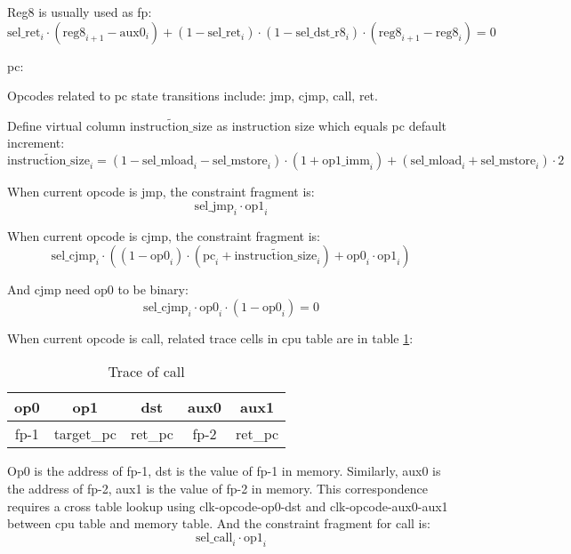 Reg8 is usually used as fp:
\[ \mathrm{sel\_ret}_i \cdot (\mathrm{reg8}_{i+1} - \mathrm{aux0}_i) + (1-\mathrm{sel\_ret}_i) \cdot (1 - \mathrm{sel\_dst\_r8}_i) \cdot (\mathrm{reg8}_{i+1} - \mathrm{reg8}_i)=0 \]

pc:

Opcodes related to pc state transitions include: jmp, cjmp, call, ret.

Define virtual column $\widetilde{\mathrm{instruction\_size}}$ as instruction size which equals pc default increment:
\[ \widetilde{\mathrm{instruction\_size}}_i = (1 - \mathrm{sel\_mload}_i - \mathrm{sel\_mstore}_i) \cdot (1 + \mathrm{op1\_imm}_i) + (\mathrm{sel\_mload}_i + \mathrm{sel\_mstore}_i) \cdot 2 \]

When current opcode is jmp, the constraint fragment is:
\[ \mathrm{sel\_jmp}_i \cdot \mathrm{op1}_i \]

When current opcode is cjmp, the constraint fragment is:
\[ \mathrm{sel\_cjmp}_i \cdot ((1 - \mathrm{op0}_i) \cdot (\mathrm{pc}_i + \widetilde{\mathrm{instruction\_size}}_i) + \mathrm{op0}_i \cdot \mathrm{op1}_i) \]

And cjmp need op0 to be binary:
\[ \mathrm{sel\_cjmp}_i \cdot \mathrm{op0}_i \cdot (1-\mathrm{op0}_i) = 0 \]

When current opcode is call, related trace cells in cpu table are in table \ref{table:constraint-call}:

\begin{table}[!ht]
    \centering
    \begin{tabular}{|c|c|c|c|c|}
        \hline
        \rowcolor{gray} op0       & op1        & dst                          & aux0                     & aux1                        \\
        \hline
        \cellcolor{green!20} fp-1 & target\_pc & \cellcolor{green!20} ret\_pc & \cellcolor{blue!20} fp-2 & \cellcolor{blue!20} ret\_pc \\
        \hline
    \end{tabular}
    \caption{Trace of call}
    \label{table:constraint-call}
\end{table}

Op0 is the address of fp-1, dst is the value of fp-1 in memory. Similarly, aux0 is the address of fp-2, aux1 is the value of fp-2 in memory. This correspondence requires a
cross table lookup using clk-opcode-op0-dst and clk-opcode-aux0-aux1 between cpu table and memory table. And the constraint fragment for call is:
\[ \mathrm{sel\_call}_i \cdot \mathrm{op1}_i \]

